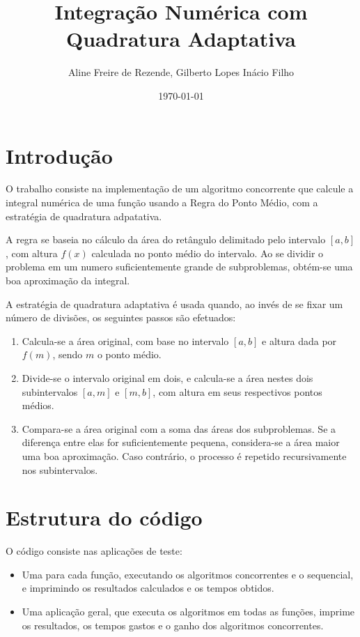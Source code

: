 \documentclass[11pt]{article}
\author{Aline Freire de Rezende, Gilberto Lopes Inácio Filho}
\date{\today}
\title{Integração Numérica com Quadratura Adaptativa}
\begin{document}
\maketitle
\tableofcontents


\section{Introdução}
\label{sec:orga1a292c}
O trabalho consiste na implementação de um algoritmo concorrente que
calcule a integral numérica de uma função usando a Regra do Ponto Médio,
com a estratégia de quadratura adpatativa.

A regra se baseia no cálculo da área do retângulo delimitado pelo
intervalo \([a, b]\), com altura \(f(x)\) calculada no ponto médio do intervalo.
Ao se dividir o problema em um numero suficientemente grande de subproblemas,
obtém-se uma boa aproximação da integral.

A estratégia de quadratura adaptativa é usada quando, ao invés de se fixar
um número de divisões, os seguintes passos são efetuados:

\begin{enumerate}
\item Calcula-se a área original, com base no intervalo \([a, b]\) e altura dada
por \(f(m)\), sendo \(m\) o ponto médio.
\item Divide-se o intervalo original em dois, e calcula-se a área nestes dois
subintervalos \([a, m]\) e \([m, b]\), com altura em seus respectivos pontos médios.
\item Compara-se a área original com a soma das áreas dos subproblemas. Se a
diferença entre elas for suficientemente pequena, considera-se a área maior
uma boa aproximação. Caso contrário, o processo é repetido recursivamente
nos subintervalos.
\end{enumerate}

\section{Estrutura do código}
\label{sec:org32c5699}
O código consiste nas aplicações de teste:
\begin{itemize}
\item Uma para cada função, executando os algoritmos concorrentes e o sequencial, e imprimindo os resultados calculados e os tempos obtidos.
\item Uma aplicação geral, que executa os algoritmos em todas as funções, imprime os resultados, os tempos gastos e o ganho dos algoritmos concorrentes.
\end{itemize}
\end{document}
